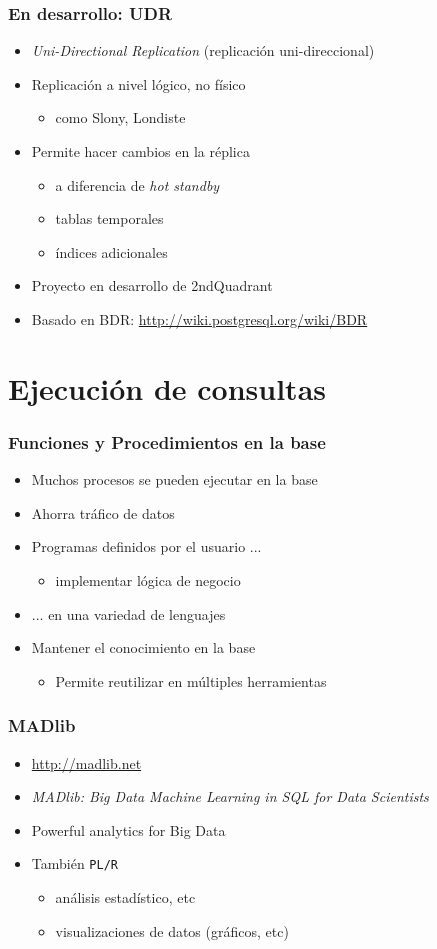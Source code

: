 \frame
{ \frametitle{En desarrollo: UDR}

\begin{itemize}
	\item \emph{Uni-Directional Replication} (replicación uni-direccional)
	\item Replicación a nivel lógico, no físico
		\begin{itemize}
			\item como Slony, Londiste
		\end{itemize}
	\item Permite hacer cambios en la réplica
		\begin{itemize}
			\item a diferencia de \emph{hot standby}
			\item tablas temporales
			\item índices adicionales
		\end{itemize}
	\item Proyecto en desarrollo de 2ndQuadrant
	\item Basado en BDR: \url{http://wiki.postgresql.org/wiki/BDR}
\end{itemize}
}

\section{Ejecución de consultas}

\frame
{ \frametitle{Funciones y Procedimientos en la base}
\begin{itemize}
	\item Muchos procesos se pueden ejecutar en la base
	\item Ahorra tráfico de datos
	\item Programas definidos por el usuario ...
		\begin{itemize}
			\item implementar lógica de negocio
		\end{itemize}
	\item ... en una variedad de lenguajes
	\item Mantener el conocimiento en la base
		\begin{itemize}
			\item Permite reutilizar en múltiples herramientas
		\end{itemize}
\end{itemize}
}


\frame
{ \frametitle{MADlib}
\begin{itemize}
	\item \url{http://madlib.net}
	\item \emph{MADlib: Big Data Machine Learning in SQL for Data Scientists}
	\item Powerful analytics for Big Data
	\item También \texttt{PL/R}
		\begin{itemize}
			\item análisis estadístico, etc
			\item visualizaciones de datos (gráficos, etc)
		\end{itemize}
\end{itemize}
}

